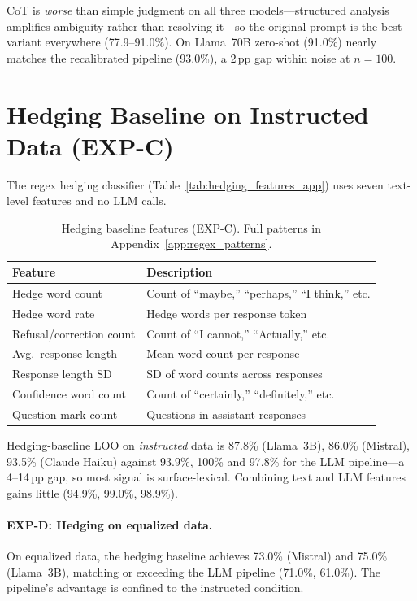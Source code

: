 CoT is \emph{worse} than simple judgment on all three models---structured analysis amplifies ambiguity rather than resolving it---so the original prompt is the best variant everywhere (77.9--91.0\%). On Llama~70B zero-shot (91.0\%) nearly matches the recalibrated pipeline (93.0\%), a 2\,pp gap within noise at $n=100$.

\section{Hedging Baseline on Instructed Data (EXP-C)}
\label{app:hedging_instructed}

The regex hedging classifier (Table~\ref{tab:hedging_features_app}) uses seven text-level features and no LLM calls.

\begin{table}[h]
\centering
\caption{Hedging baseline features (EXP-C). Full patterns in Appendix~\ref{app:regex_patterns}.}
\label{tab:hedging_features_app}
\label{tab:hedging_features}
\begin{tabular}{ll}
\toprule
\textbf{Feature} & \textbf{Description} \\
\midrule
Hedge word count     & Count of ``maybe,'' ``perhaps,'' ``I think,'' etc. \\
Hedge word rate      & Hedge words per response token \\
Refusal/correction count & Count of ``I cannot,'' ``Actually,'' etc. \\
Avg.\ response length  & Mean word count per response \\
Response length SD   & SD of word counts across responses \\
Confidence word count & Count of ``certainly,'' ``definitely,'' etc. \\
Question mark count  & Questions in assistant responses \\
\bottomrule
\end{tabular}
\end{table}

Hedging-baseline LOO on \emph{instructed} data is 87.8\% (Llama~3B), 86.0\% (Mistral), 93.5\% (Claude Haiku) against 93.9\%, 100\% and 97.8\% for the LLM pipeline---a 4--14\,pp gap, so most signal is surface-lexical. Combining text and LLM features gains little (94.9\%, 99.0\%, 98.9\%).

\paragraph{EXP-D: Hedging on equalized data.} On equalized data, the hedging baseline achieves 73.0\% (Mistral) and 75.0\% (Llama~3B), matching or exceeding the LLM pipeline (71.0\%, 61.0\%). The pipeline's advantage is confined to the instructed condition.

